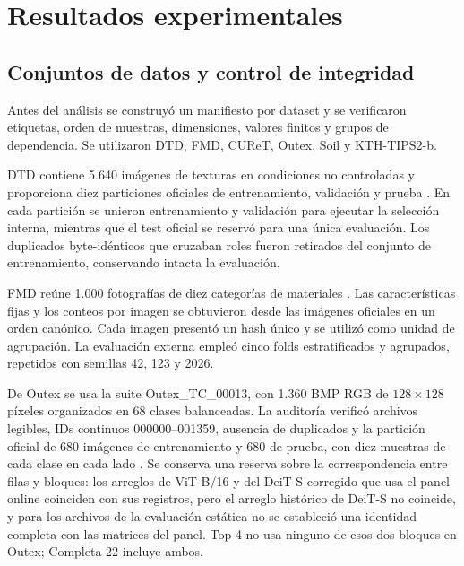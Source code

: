 \documentclass[a4paper,fleqn]{cas-sc}
\begin{document}
\section{Resultados experimentales}\label{sec:resultados-experimentales}

\subsection{Conjuntos de datos y control de integridad}\label{sec:datos}

Antes del análisis se construyó un manifiesto por dataset y se verificaron etiquetas, orden de muestras, dimensiones, valores finitos y grupos de dependencia. Se utilizaron DTD, FMD, CUReT, Outex, Soil y KTH-TIPS2-b.

DTD contiene 5.640 imágenes de texturas en condiciones no controladas y proporciona diez particiones oficiales de entrenamiento, validación y prueba \citep{cimpoi2014dtd}. En cada partición se unieron entrenamiento y validación para ejecutar la selección interna, mientras que el test oficial se reservó para una única evaluación. Los duplicados byte-idénticos que cruzaban roles fueron retirados del conjunto de entrenamiento, conservando intacta la evaluación.

FMD reúne 1.000 fotografías de diez categorías de materiales \citep{sharan2013fmd}. Las características fijas y los conteos por imagen se obtuvieron desde las imágenes oficiales en un orden canónico. Cada imagen presentó un hash único y se utilizó como unidad de agrupación. La evaluación externa empleó cinco folds estratificados y agrupados, repetidos con semillas 42, 123 y 2026.

De Outex se usa la suite Outex\_TC\_00013, con 1.360 BMP RGB de $128\times128$ píxeles organizados en 68 clases balanceadas. La auditoría verificó archivos legibles, IDs continuos 000000--001359, ausencia de duplicados y la partición oficial de 680 imágenes de entrenamiento y 680 de prueba, con diez muestras de cada clase en cada lado \citep{ojala2002outex}. Se conserva una reserva sobre la correspondencia entre filas y bloques: los arreglos de ViT-B/16 y del DeiT-S corregido que usa el panel online coinciden con sus registros, pero el arreglo histórico de DeiT-S no coincide, y para los archivos de la evaluación estática no se estableció una identidad completa con las matrices del panel. Top-4 no usa ninguno de esos dos bloques en Outex; Completa-22 incluye ambos.
\end{document}
